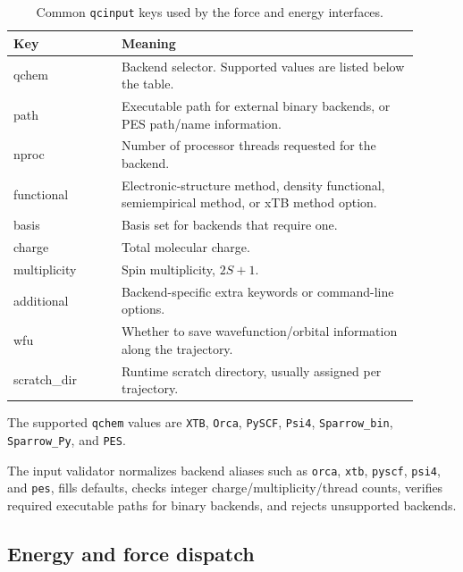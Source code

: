 \documentclass[11pt]{article}
\begin{document}
\begin{table}[h]
\centering
\caption{Common \texttt{qcinput} keys used by the force and energy interfaces.}
\label{tab:qcinput}
\begin{tabular}{>{\ttfamily}p{0.24\linewidth}p{0.66\linewidth}}
\toprule
\normalfont Key & Meaning \\
\midrule
qchem & Backend selector. Supported values are listed below the table. \\
path & Executable path for external binary backends, or PES path/name information. \\
nproc & Number of processor threads requested for the backend. \\
functional & Electronic-structure method, density functional, semiempirical method, or xTB method option. \\
basis & Basis set for backends that require one. \\
charge & Total molecular charge. \\
multiplicity & Spin multiplicity, $2S+1$. \\
additional & Backend-specific extra keywords or command-line options. \\
wfu & Whether to save wavefunction/orbital information along the trajectory. \\
scratch\_dir & Runtime scratch directory, usually assigned per trajectory. \\
\bottomrule
\end{tabular}
\end{table}

The supported \texttt{qchem} values are \texttt{XTB}, \texttt{Orca}, \texttt{PySCF}, \texttt{Psi4}, \texttt{Sparrow\_bin}, \texttt{Sparrow\_Py}, and \texttt{PES}.

The input validator normalizes backend aliases such as \texttt{orca}, \texttt{xtb}, \texttt{pyscf}, \texttt{psi4}, and \texttt{pes}, fills defaults, checks integer charge/multiplicity/thread counts, verifies required executable paths for binary backends, and rejects unsupported backends.

\subsection{Energy and force dispatch}
\end{document}
